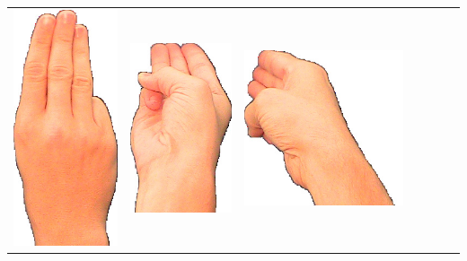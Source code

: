 \documentclass{article}
\begin{document}
\begin{center}
\begin{tabular}{r*{6}{c}}
\includegraphics[scale=0.1]{images/06-04-3.jpg}&
\includegraphics[scale=0.1]{images/06-04-4.jpg}&
\includegraphics[scale=0.1]{images/06-04-5.jpg}&

\end{tabular}
\end{center}
\end{document}
